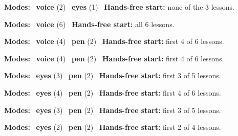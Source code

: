 \expandafter\def\csname hlchaptermodality6\endcsname{%
  {\small\noindent
    \textbf{Modes:} \hlvoicesign{}~\textbf{voice} (2) \quad \hlsightsign{}~\textbf{eyes} (1)\quad
    \hlvoicesign{}~\textbf{Hands-free start:} none of the 3 lessons.%
    \par}\medskip
}

\expandafter\def\csname hlchaptermodality7\endcsname{%
  {\small\noindent
    \textbf{Modes:} \hlvoicesign{}~\textbf{voice} (6)\quad
    \hlvoicesign{}~\textbf{Hands-free start:} all 6 lessons.%
    \par}\medskip
}

\expandafter\def\csname hlchaptermodality8\endcsname{%
  {\small\noindent
    \textbf{Modes:} \hlvoicesign{}~\textbf{voice} (4) \quad \hlpensign{}~\textbf{pen} (2)\quad
    \hlvoicesign{}~\textbf{Hands-free start:} first 4 of 6 lessons.%
    \par}\medskip
}

\expandafter\def\csname hlchaptermodality9\endcsname{%
  {\small\noindent
    \textbf{Modes:} \hlvoicesign{}~\textbf{voice} (4) \quad \hlpensign{}~\textbf{pen} (2)\quad
    \hlvoicesign{}~\textbf{Hands-free start:} first 4 of 6 lessons.%
    \par}\medskip
}

\expandafter\def\csname hlchaptermodality10\endcsname{%
  {\small\noindent
    \textbf{Modes:} \hlsightsign{}~\textbf{eyes} (3) \quad \hlpensign{}~\textbf{pen} (2)\quad
    \hlvoicesign{}~\textbf{Hands-free start:} first 3 of 5 lessons.%
    \par}\medskip
}

\expandafter\def\csname hlchaptermodality11\endcsname{%
  {\small\noindent
    \textbf{Modes:} \hlsightsign{}~\textbf{eyes} (4) \quad \hlpensign{}~\textbf{pen} (2)\quad
    \hlvoicesign{}~\textbf{Hands-free start:} first 4 of 6 lessons.%
    \par}\medskip
}

\expandafter\def\csname hlchaptermodality12\endcsname{%
  {\small\noindent
    \textbf{Modes:} \hlsightsign{}~\textbf{eyes} (3) \quad \hlpensign{}~\textbf{pen} (2)\quad
    \hlvoicesign{}~\textbf{Hands-free start:} first 3 of 5 lessons.%
    \par}\medskip
}

\expandafter\def\csname hlchaptermodality13\endcsname{%
  {\small\noindent
    \textbf{Modes:} \hlsightsign{}~\textbf{eyes} (2) \quad \hlpensign{}~\textbf{pen} (2)\quad
    \hlvoicesign{}~\textbf{Hands-free start:} first 2 of 4 lessons.%
    \par}\medskip
}

